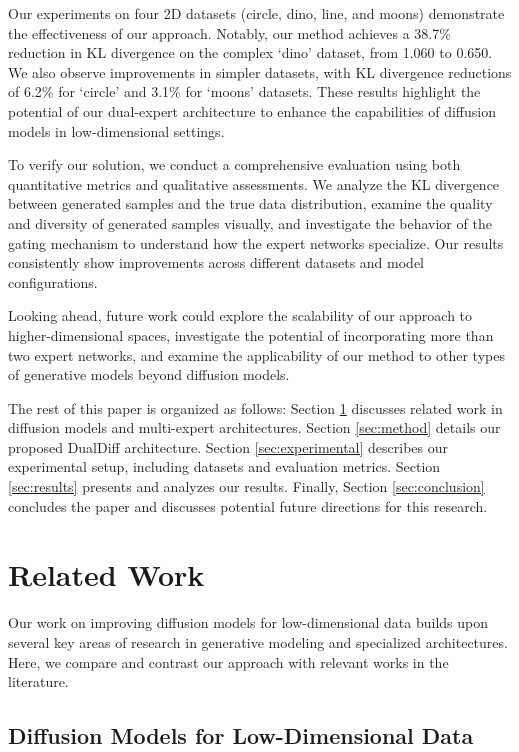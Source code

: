 \documentclass{article} %
\begin{document}
Our experiments on four 2D datasets (circle, dino, line, and moons) demonstrate the effectiveness of our approach. Notably, our method achieves a 38.7\% reduction in KL divergence on the complex `dino' dataset, from 1.060 to 0.650. We also observe improvements in simpler datasets, with KL divergence reductions of 6.2\% for `circle' and 3.1\% for `moons' datasets. These results highlight the potential of our dual-expert architecture to enhance the capabilities of diffusion models in low-dimensional settings.

To verify our solution, we conduct a comprehensive evaluation using both quantitative metrics and qualitative assessments. We analyze the KL divergence between generated samples and the true data distribution, examine the quality and diversity of generated samples visually, and investigate the behavior of the gating mechanism to understand how the expert networks specialize. Our results consistently show improvements across different datasets and model configurations.

Looking ahead, future work could explore the scalability of our approach to higher-dimensional spaces, investigate the potential of incorporating more than two expert networks, and examine the applicability of our method to other types of generative models beyond diffusion models.

The rest of this paper is organized as follows: Section \ref{sec:related} discusses related work in diffusion models and multi-expert architectures. Section \ref{sec:method} details our proposed DualDiff architecture. Section \ref{sec:experimental} describes our experimental setup, including datasets and evaluation metrics. Section \ref{sec:results} presents and analyzes our results. Finally, Section \ref{sec:conclusion} concludes the paper and discusses potential future directions for this research.

\section{Related Work}
\label{sec:related}

Our work on improving diffusion models for low-dimensional data builds upon several key areas of research in generative modeling and specialized architectures. Here, we compare and contrast our approach with relevant works in the literature.

\subsection{Diffusion Models for Low-Dimensional Data}
\end{document}
